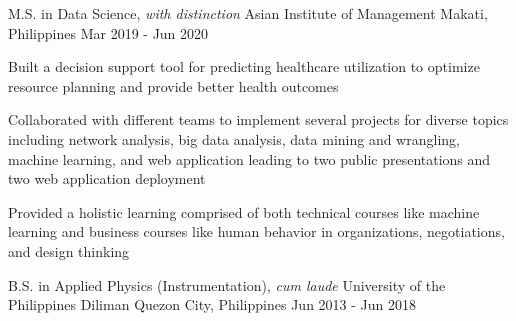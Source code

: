 

\begin{cventries}

  \cventry
    {M.S. in Data Science, \textit{with distinction}} %
    {Asian Institute of Management} %
    {Makati, Philippines} %
    {Mar 2019 - Jun 2020} %
    {
      \begin{cvitems} %
        \item{Built a decision support tool for predicting healthcare utilization to optimize resource planning and provide better health outcomes}
        \item{Collaborated with different teams to implement several projects for diverse topics including network analysis, big data analysis, data mining and wrangling, machine learning, and web application leading to two public presentations and two web application deployment}
        \item{Provided a holistic learning comprised of both technical courses like machine learning and business courses like human behavior in organizations, negotiations, and design thinking}
      \end{cvitems}
    }

  \cventry
    {B.S. in Applied Physics (Instrumentation), \textit{cum laude}} %
    {University of the Philippines Diliman} %
    {Quezon City, Philippines} %
    {Jun 2013 - Jun 2018} %
    {}
\end{cventries}
\vspace{-1.5em}